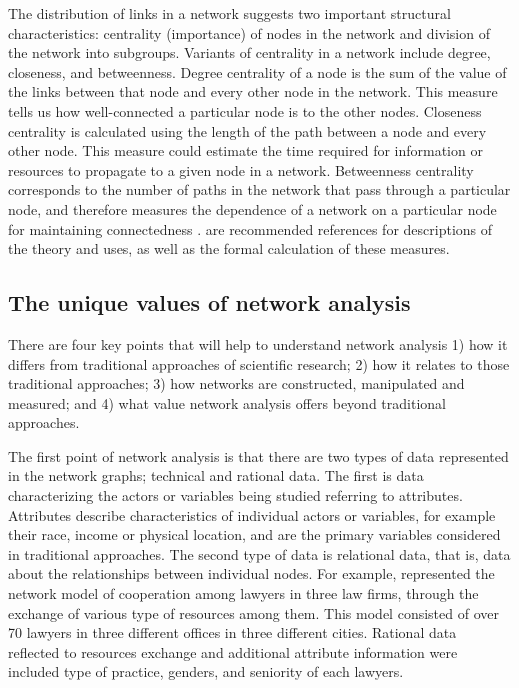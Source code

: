 The distribution of links in a network suggests two important structural characteristics: centrality (importance) of nodes in the network and division of the network into subgroups. Variants of centrality in a network include degree, closeness, and betweenness. Degree centrality of a node is the sum of the value of the links between that node and every other node in the network. This measure tells us how well-connected a particular node is to the other nodes. Closeness centrality is calculated using the length of the path between a node and every other node. This measure could estimate the time required for information or resources to propagate to a given node in a network. Betweenness centrality corresponds to the number of paths in the network that pass through a particular node, and therefore measures the dependence of a network on a particular node for maintaining connectedness \citep{Toubiana:2013cv}. \citet{Deng:2012do,newman2003structure,Toubiana:2013cv} are recommended references for descriptions of the theory and uses, as well as the formal calculation of these measures.


\subsection*{The unique values of network analysis}

There are four key points that will help to understand network analysis 1) how it differs from traditional approaches of scientific research; 2) how it relates to those traditional approaches; 3) how networks are constructed, manipulated and measured; and 4) what value network analysis offers beyond traditional approaches.

The first point of network analysis is that there are two types of data represented in the network graphs; technical and rational data. The first is data characterizing the actors or variables being studied referring to attributes. Attributes describe characteristics of individual actors or variables, for example their race, income or physical location, and are the primary variables considered in traditional approaches. The second type of data is relational data, that is, data about the relationships between individual nodes. For example, \citet{Lazega} represented the network model of cooperation among lawyers in three law firms, through the exchange of various type of resources among them. This model consisted of over 70 lawyers in three different offices in three different cities. Rational data reflected to resources exchange and additional attribute information were included type of practice, genders, and seniority of each lawyers.

